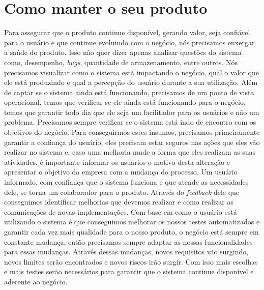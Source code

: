   \section{Como manter o seu produto}
    Para assegurar que o produto continue disponível, gerando valor, seja confiável
    para o usuário e que continue evoluindo com o negócio, nós precisamos enxergar
    a saúde do produto. Isso não quer dizer apenas analisar questões do sistema
    como, desempenho, \textit{bugs}, quantidade de armazenamento, entre outros.
    Nós precisamos visualizar como o sistema está impactando o negócio, qual o
    valor que ele está produzindo e qual a percepção do usuário durante a sua
    utilização. Além de captar se o sistema ainda está funcionando, precisamos de
    um ponto de vista operacional, temos que verificar se ele ainda está funcionando
    para o negócio, temos que garantir todo dia que ele seja um facilitador para
    os usuários e não um problema. Precisamos sempre verificar se o sistema está
    indo de encontro com os objetivos do negócio. \newline
    Para conseguirmos estes insumos, precisamos primeiramente garantir a confiança
    do usuário, eles precisam estar seguros nas ações que eles vão realizar no
    sistema e, caso uma melhoria mude a forma que eles realizam as suas atividades,
    é importante informar os usuários o motivo desta alteração e apresentar o
    objetivo da empresa com a mudança do processo. Um usuário informado, com
    confiança que o sistema funciona e que atende as necessidades dele, se torna
    um colaborador para o produto. Através do \textit{feedback} dele que conseguimos
    identificar melhorias que devemos realizar e como realizar as comunicações de
    novas implementações. Com base em como o usuário está utilizando o sistema
    é que conseguimos melhorar os nossos testes automatizados e garantir cada vez
    mais qualidade para o nosso produto, o negócio está sempre em constante
    mudança, então precisamos sempre adaptar as nossas funcionalidades para essas
    mudanças. Através dessas mudanças, novos requisitos vão surgindo, novos
    limites serão encontrados e novos riscos irão surgir. Com isso mais escolhas
    e mais testes serão necessários para garantir que o sistema continue disponível
    e aderente ao negócio.

